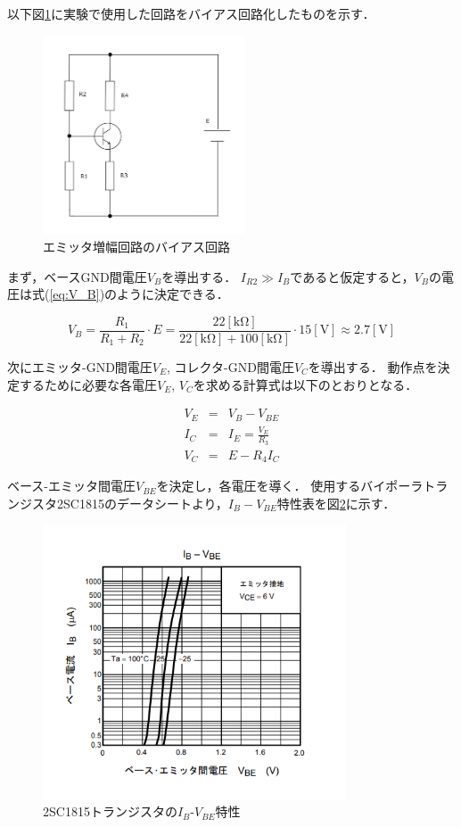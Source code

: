 \documentclass[dvipdfmx,titlepage,a4j]{jsarticle}  %
\numberwithin{equation}{section}
\begin{document}
以下図\ref{fig:fig2-bias.jpg}に実験で使用した回路をバイアス回路化したものを示す．
\begin{figure}[H]
  \centering
  \includegraphics[width=6cm]{../fig/fig2-bias.jpg}
  \caption{エミッタ増幅回路のバイアス回路}
  \label{fig:fig2-bias.jpg}
\end{figure}

まず，ベースGND間電圧$V_B$を導出する．
$I_{R2} \gg  I_B$であると仮定すると，$V_B$の電圧は式(\ref{eq:V_B})のように決定できる．

\begin{equation}
  V_B = \frac{R_1}{R_1 + R_2} \cdot E = \frac{22 \mathrm{[k\Omega]}}{22 \mathrm{[k\Omega]} + 100 \mathrm{[k\Omega]}} \cdot 15 \mathrm{[V]} \approx  2.7 \mathrm{[V]}
  \label{eq:V_B}
\end{equation}

次にエミッタ-GND間電圧$V_{E}$, コレクタ-GND間電圧$V_{C}$を導出する．
動作点を決定するために必要な各電圧$V_{E}$, $V_{C}$を求める計算式は以下のとおりとなる．

\begin{eqnarray}
  V_E &=& V_B - V_{BE} \\
  I_C &=& I_E = \frac{V_E}{R_3} \\
  V_C &=& E - R_4 I_C
\end{eqnarray}

ベース-エミッタ間電圧$V_{BE}$を決定し，各電圧を導く．
使用するバイポーラトランジスタ2SC1815のデータシートより，$I_B - V_{BE}$特性表を図\ref{fig:ibvbe.png}に示す．
\begin{figure}[H]
  \centering
  \includegraphics[width=9cm]{../2sc1815/ibvbe.png}
  \caption{2SC1815トランジスタの$I_B$-$V_{BE}$特性}
  \label{fig:ibvbe.png}
\end{figure}
\end{document}
